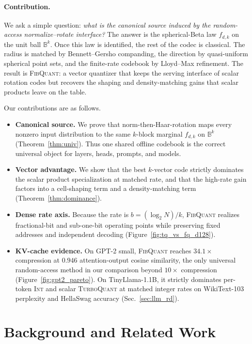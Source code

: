 \documentclass{article}
\theoremstyle{definition}
\theoremstyle{remark}
\newcommand{\bbB}{\mathbb{B}}
\begin{document}
\paragraph{Contribution.}
We ask a simple question: \emph{what is the canonical source induced
by the random-access normalize--rotate interface?}  The answer is
the spherical-Beta law $f_{d, k}$ on the unit ball $\bbB^k$.  Once
this law is identified, the rest of the codec is classical.  The
radius is matched by Bennett--Gersho companding, the direction by
quasi-uniform spherical point sets, and the finite-rate codebook by
Lloyd--Max refinement.  The result is \textsc{FibQuant}: a vector
quantizer that keeps the serving interface of scalar rotation codes
but recovers the shaping and density-matching gains that scalar
products leave on the table.

Our contributions are as follows.
\begin{itemize}
\item \textbf{Canonical source.}  We prove that
norm-then-Haar-rotation maps every nonzero input distribution to the
same $k$-block marginal $f_{d, k}$ on $\bbB^k$
(Theorem~\ref{thm:univ}).  Thus one shared offline codebook is the
correct universal object for layers, heads, prompts, and models.
\item \textbf{Vector advantage.}  We show that the best $k$-vector
code strictly dominates the scalar product specialization at matched
rate, and that the high-rate gain factors into a cell-shaping term
and a density-matching term (Theorem~\ref{thm:dominance}).
\item \textbf{Dense rate axis.}  Because the rate is
$b = (\log_2 N)/k$, \textsc{FibQuant} realizes fractional-bit and
sub-one-bit operating points while preserving fixed addresses and
independent decoding (Figure~\ref{fig:tq_vs_fq_d128}).
\item \textbf{KV-cache evidence.}  On GPT-2 small,
\textsc{FibQuant} reaches $34.1\times$ compression at $0.946$
attention-output cosine similarity, the only universal random-access
method in our comparison beyond $10\times$ compression
(Figure~\ref{fig:gpt2_pareto}).  On TinyLlama-1.1B, it strictly
dominates per-token \textsc{Int} and scalar \textsc{TurboQuant} at
matched integer rates on WikiText-103 perplexity and HellaSwag
accuracy (Sec.~\ref{sec:llm_rd}).
\end{itemize}

\section{Background and Related Work}
\label{sec:related}
\end{document}
